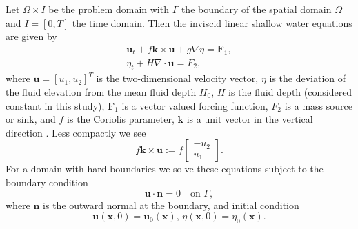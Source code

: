 Let $\Omega \times I$ be the problem domain with $\Gamma$ the boundary of the
spatial domain $\Omega$ and $I = [0, T]$ the time domain.  Then the inviscid
linear shallow water equations are given by
\begin{equation}
  \begin{split}
    \mathbf{u}_t + f\mathbf{k} \times \mathbf{u} + g \nabla \eta = \mathbf{F}_1, \\
    \eta_t + H \nabla\cdot \mathbf{u} = F_2,
  \end{split}
  \label{eqn:SWE}
\end{equation}
where $\mathbf{u}=[u_1,u_2]^T$ is the two-dimensional velocity vector, $\eta$ is the
deviation of the fluid elevation from the mean fluid depth $H_0$, $H$ is the
fluid depth (considered constant in this study), $\mathbf{F}_1$ is a vector valued
forcing function, $F_2$ is a mass source or sink, and $f$ is the Coriolis
parameter, $\mathbf{k}$ is a unit vector in the vertical direction
\cite{Hanert2004, LeBlond1981, Le-Roux1998}.  Less compactly we see
\begin{equation}
  f\mathbf{k} \times \mathbf{u} := f\begin{bmatrix}
    -u_2 \\
    u_1
  \end{bmatrix}.
  \label{eqn:Coriolis}
\end{equation}
For a domain with hard boundaries
we solve these equations subject to the boundary condition
\begin{equation}
  \mathbf{u}\cdot \mathbf{n} = 0 \quad \text{on } \Gamma,
  \label{eqn:BCs}
\end{equation}
where $\mathbf{n}$ is the outward normal at the boundary,
and initial condition
\begin{equation}
  \mathbf{u}(\mathbf{x},0) = \mathbf{u}_0(\mathbf{x}),\, \eta(\mathbf{x},0) =
    \eta_0(\mathbf{x}).
  \label{eqn:IC}
\end{equation}

